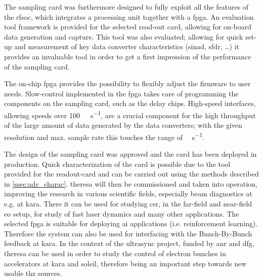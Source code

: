 The sampling card was furthermore designed to fully exploit all the features of the \gls{rfsoc}, which integrates a processing unit together with a \gls{fpga}.
An evaluation tool framework is provided for the selected read-out card, allowing for on-board data generation and capture.
This tool was also evaluated; allowing for quick set-up and measurement of key data converter characteristics (\gls{sinad}, \gls{sfdr}, \ldots) it provides an invaluable tool in order to get a first impression of the performance of the sampling card.

The on-chip \gls{fpga} provides the possibility to flexibly adjust the firmware to user needs. 
Slow-control implemented in the \gls{fpga} takes care of programming the components on the sampling card, such as the delay chips.
High-speed interfaces, allowing speeds over \SI{100}{\giga\bits\per\second}, are a crucial component for the high throughput of the large amount of data generated by the data converters; with the given resolution and max. sample rate this touches the range of \si{\tera\bits\per\second}.


The design of the sampling card was approved and the card has been deployed in production.
Quick characterization of the card is possible due to the tool provided for the readout-card and can be carried out using the methods described in \autoref{ssec:adc_charac}.
\gls{theresa} will then be commissioned and taken into operation, improving the research in various scientific fields, especially beam diagnostics at e.g. at \gls{kara}. 
There it can be used for studying \gls{csr}, in the far-field and near-field \gls{eo} setup, for study of fast laser dynamics and many other applications.
The selected \gls{fpga} is suitable for deploying \gls{ai} applications (i.e. reinforcement learning).
Therefore the system can also be used for interfacing with the Bunch-By-Bunch feedback at \gls{kara}.
In the context of the \gls{ultrasync} project, funded by \gls{anr} and \gls{dfg}, \gls{theresa} can be used in order to study the control of electron bunches in accelerators at \gls{kara} and \gls{soleil}, therefore being an important step towards new usable \gls{thz} sources. 
 


